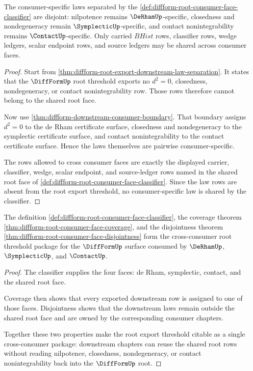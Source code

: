 \begin{theorem}
\label{thm:diffform-root-consumer-face-disjointness}
The consumer-specific laws separated by the
\autoref{def:diffform-root-consumer-face-classifier} are disjoint:
nilpotence remains $\DeRhamUp$-specific, closedness and nondegeneracy remain
$\SymplecticUp$-specific, and contact nonintegrability remains
$\ContactUp$-specific. Only carried $BHist$ rows, classifier rows, wedge
ledgers, scalar endpoint rows, and source ledgers may be shared across
consumer faces.
\end{theorem}
\begin{proof}
Start from \autoref{thm:diffform-root-export-downstream-law-separation}. It
states that the $\DiffFormUp$ root threshold exports no $d^2=0$, closedness,
nondegeneracy, or contact nonintegrability row. Those rows therefore cannot
belong to the shared root face.

Now use \autoref{thm:diffform-downstream-consumer-boundary}. That boundary
assigns $d^2=0$ to the de Rham certificate surface, closedness and
nondegeneracy to the symplectic certificate surface, and contact
nonintegrability to the contact certificate surface. Hence the laws themselves
are pairwise consumer-specific.

The rows allowed to cross consumer faces are exactly the displayed carrier,
classifier, wedge, scalar endpoint, and source-ledger rows named in the shared
root face of \autoref{def:diffform-root-consumer-face-classifier}. Since the
law rows are absent from the root export threshold, no consumer-specific law is
shared by the classifier.
\end{proof}

\begin{theorem}
\label{thm:diffform-root-cross-consumer-threshold-package}
The definition
\autoref{def:diffform-root-consumer-face-classifier}, the coverage theorem
\autoref{thm:diffform-root-consumer-face-coverage}, and the disjointness
theorem \autoref{thm:diffform-root-consumer-face-disjointness} form the
cross-consumer root threshold package for the $\DiffFormUp$ surface consumed by
$\DeRhamUp$, $\SymplecticUp$, and $\ContactUp$.
\end{theorem}
\begin{proof}
The classifier supplies the four faces: de Rham, symplectic, contact, and the
shared root face.

Coverage then shows that every exported downstream row is assigned to one of
those faces. Disjointness shows that the downstream laws remain outside the
shared root face and are owned by the corresponding consumer chapters.

Together these two properties make the root export threshold citable as a
single cross-consumer package: downstream chapters can reuse the shared root
rows without reading nilpotence, closedness, nondegeneracy, or contact
nonintegrability back into the $\DiffFormUp$ root.
\end{proof}
